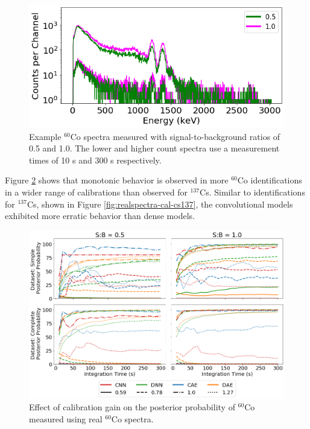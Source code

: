 \begin{figure}[H]
	\centering
	\includegraphics[width=0.85\linewidth]{images/realspectra-cal-co60-spec}
	\caption{Example $^{60}$Co spectra measured with signal-to-background ratios of 0.5 and 1.0. The lower and higher count spectra use a measurement times of 10 s and 300 s respectively.}
	\label{fig:realspectra-cal-co60-spec}
\end{figure}

Figure \ref{fig:realspectra-cal-co60} shows that monotonic behavior is observed in more $^{60}$Co identifications in a wider range of calibrations than observed for $^{137}$Cs. Similar to identifications for $^{137}$Cs, shown in Figure \ref{fig:realspectra-cal-cs137}, the convolutional models exhibited more erratic behavior than dense models.

\begin{figure}[H]
	\centering
	\includegraphics[width=1.0\linewidth]{images/realspectra-cal-co60}
		\caption{Effect of calibration gain on the posterior probability of $^{60}$Co measured using real $^{60}$Co spectra.}
	\label{fig:realspectra-cal-co60}
\end{figure}


